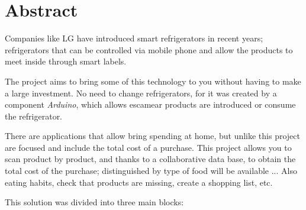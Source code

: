 \chapter*{Abstract}

Companies like LG have introduced smart refrigerators in recent years; refrigerators that can be controlled via mobile phone and allow the products to meet inside through smart labels.

The project aims to bring some of this technology to you without having to make a large investment. No need to change refrigerators, for it was created by a component \emph{Arduino}, which allows escamear products are introduced or consume the refrigerator.

There are applications that allow bring spending at home, but unlike this project are focused and include the total cost of a purchase. This project allows you to scan product by product, and thanks to a collaborative data base, to obtain the total cost of the purchase; distinguished by type of food will be available ... Also eating habits, check that products are missing, create a shopping list, etc.

This solution was divided into three main blocks:

